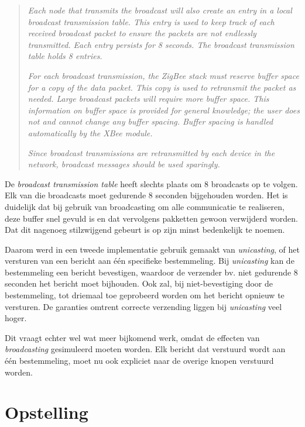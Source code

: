 \begin{quote}

\emph{Each node that transmits the broadcast will also create an entry in a
local broadcast transmission table. This entry is used to keep track of each
received broadcast packet to ensure the packets are not endlessly transmitted.
Each entry persists for 8 seconds. The broadcast transmission table holds 8
entries.}

\emph{For each broadcast transmission, the ZigBee stack must reserve buffer
space for a copy of the data packet. This copy is used to retransmit the packet
as needed. Large broadcast packets will require more buffer space. This
information on buffer space is provided for general knowledge; the user does
not and cannot change any buffer spacing. Buffer spacing is handled
automatically by the XBee module.}

\emph{Since broadcast transmissions are retransmitted by each device in the
network, broadcast messages should be used sparingly.}

\end{quote}

De \emph{broadcast transmission table} heeft slechts plaats om 8 broadcasts op
te volgen. Elk van die broadcasts moet gedurende 8 seconden bijgehouden worden.
Het is duidelijk dat bij gebruik van broadcasting om alle communicatie te
realiseren, deze buffer snel gevuld is en dat vervolgens pakketten gewoon
verwijderd worden. Dat dit nagenoeg stilzwijgend gebeurt is op zijn minst
bedenkelijk te noemen.

Daarom werd in een tweede implementatie gebruik gemaakt van \emph{unicasting},
of het versturen van een bericht aan \'e\'en specifieke bestemmeling. Bij
\emph{unicasting} kan de bestemmeling een bericht bevestigen, waardoor de
verzender bv. niet gedurende 8 seconden het bericht moet bijhouden. Ook zal,
bij niet-bevestiging door de bestemmeling, tot driemaal toe geprobeerd worden
om het bericht opnieuw te versturen. De garanties omtrent correcte verzending
liggen bij \emph{unicasting} veel hoger.

Dit vraagt echter wel wat meer bijkomend werk, omdat de effecten van
\emph{broadcasting} gesimuleerd moeten worden. Elk bericht dat verstuurd wordt
aan \'e\'en bestemmeling, moet nu ook expliciet naar de overige knopen
verstuurd worden.

\section{Opstelling}

